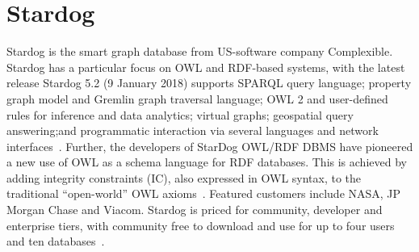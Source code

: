 \section{Stardog}
Stardog is the smart graph database from US-software company Complexible. Stardog has a particular 
focus on OWL and RDF-based systems, with the latest release Stardog 5.2 (9 January 2018) supports 
SPARQL query language; property graph model and Gremlin graph traversal language; OWL 2 and 
user-defined rules for inference and data analytics; virtual graphs; geospatial query answering;and 
programmatic interaction via several languages and network 
interfaces~\cite{hid-sp18-405-wwwdocs-stardog}. Further, the developers of StarDog OWL/RDF DBMS 
have pioneered a new use of OWL as a schema language for RDF databases. This is achieved by adding 
integrity constraints (IC), also expressed in OWL syntax, to the traditional ``open-world'' OWL 
axioms~\cite{hid-sp18-405-cer2012graphical-stardog}. Featured customers include NASA, JP Morgan 
Chase and Viacom. Stardog is priced for community, developer and enterprise tiers, with community 
free to download and use for up to four users and ten databases~\cite{hid-sp18-405-www-stardog}.


